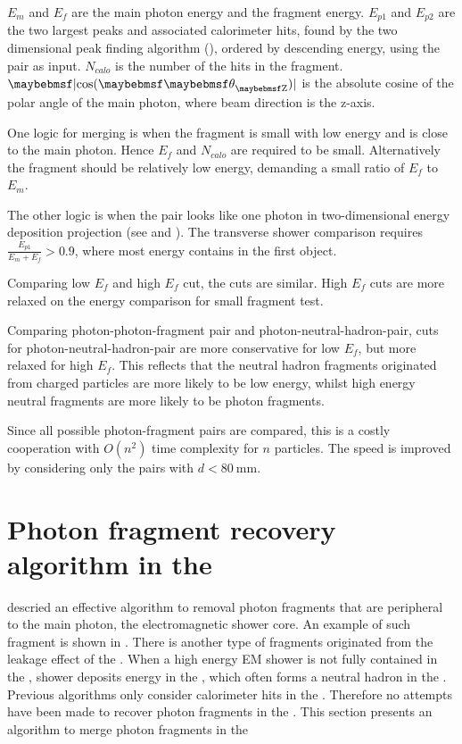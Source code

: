 $E_m$ and $E_f$ are the main photon energy and the fragment energy. $E_{p1}$ and $E_{p2}$ are the two largest peaks and associated calorimeter hits, found by the two dimensional peak finding algorithm (), ordered by descending energy, using the pair as input. $N_{calo}$ is the number of the \ECAL hits in the fragment. $\absCosTheta$ is the absolute cosine of the polar angle of the main photon, where beam direction is the z-axis.

One logic for merging is when the fragment is small with low energy and is close to the main photon. Hence $E_f$  and $N_{calo}$ are required to be small. Alternatively the fragment should be relatively low energy, demanding a small ratio of $E_f$ to $E_m$.

The other logic is when the pair looks like one photon in two-dimensional energy deposition projection (see  and ). The transverse shower comparison requires $\frac{E_{p1}}{E_m + E_f} > 0.9 $, where most energy contains in the first \ShowerPeak object.

Comparing low $E_f$ and high $E_f$ cut, the cuts are similar. High $E_f$ cuts are more relaxed on the energy comparison for small fragment test.

Comparing photon-photon-fragment pair and photon-neutral-hadron-pair, cuts for photon-neutral-hadron-pair are more conservative for low $E_f$, but more relaxed for high $E_f$. This reflects that the neutral hadron fragments originated from charged particles are more likely to be low energy, whilst high energy neutral fragments are more likely to be photon fragments.

Since all possible photon-fragment pairs are compared, this is a costly cooperation with $O(n^2)$ time complexity for $n$ particles. The speed is improved by considering only the pairs with $d<80\ \text{mm}$.


\section{Photon fragment recovery algorithm in the \HCAL}
\label{sec:photonHighEFragRemoval}

 descried an effective algorithm to removal photon fragments that are peripheral to the main photon, the electromagnetic shower core. An example of such fragment is shown in . There is another type of fragments originated from the leakage effect of the \ECAL. When a high energy EM shower is not fully contained in the \ECAL, shower deposits energy in the \HCAL, which often forms a neutral hadron in the \HCAL. Previous algorithms only consider calorimeter hits in the \ECAL.  Therefore no attempts have been made to recover photon fragments in the \HCAL. This section presents an algorithm to merge photon fragments in the \HCAL

